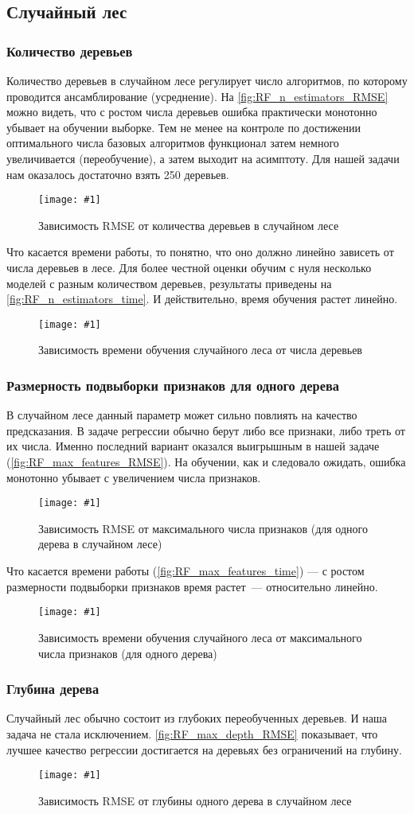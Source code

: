 \documentclass[12pt]{article}
\newcommand{\mpl}[2]{
    \begin{figure}[!h]
        \texttt{[image: \#1]}
        \centering
        \caption{#2}
        \label{fig:#1}
     \end{figure}
}
\begin{document}
\subsection{Случайный лес}
\subsubsection{Количество деревьев}
Количество деревьев в случайном лесе регулирует число алгоритмов, по которому проводится ансамблирование (усреднение). На \autoref{fig:RF_n_estimators_RMSE} можно видеть, что с ростом числа деревьев ошибка практически монотонно убывает на обучении выборке. Тем не менее на контроле по достижении оптимального числа базовых алгоритмов функционал затем немного увеличивается (переобучение), а затем выходит на асимптоту. Для нашей задачи нам оказалось достаточно взять 250 деревьев.

\mpl{RF_n_estimators_RMSE}{Зависимость RMSE от количества деревьев в случайном лесе}

Что касается времени работы, то понятно, что оно должно линейно зависеть от числа деревьев в лесе. Для более честной оценки обучим с нуля несколько моделей с разным количеством деревьев, результаты приведены на \autoref{fig:RF_n_estimators_time}. И действительно, время обучения растет линейно.
\mpl{RF_n_estimators_time}{Зависимость времени обучения случайного леса от числа деревьев}

\subsubsection{Размерность подвыборки признаков для одного дерева}
В случайном лесе данный параметр может сильно повлиять на качество предсказания. В задаче регрессии обычно берут либо все признаки, либо треть от их числа. Именно последний вариант оказался выигрышным в нашей задаче (\autoref{fig:RF_max_features_RMSE}). На обучении, как и следовало ожидать, ошибка монотонно убывает с увеличением числа признаков.
\mpl{RF_max_features_RMSE}{Зависимость RMSE от максимального числа признаков (для одного дерева в случайном лесе)}

Что касается времени работы (\autoref{fig:RF_max_features_time}) — с ростом размерности подвыборки признаков время растет~--- относительно линейно.
\mpl{RF_max_features_time}{Зависимость времени обучения случайного леса от максимального числа признаков (для одного дерева)}

\subsubsection{Глубина дерева}
Случайный лес обычно состоит из глубоких переобученных деревьев. И наша задача не стала исключением. \autoref{fig:RF_max_depth_RMSE} показывает, что лучшее качество регрессии достигается на деревьях без ограничений на глубину.  
\mpl{RF_max_depth_RMSE}{Зависимость RMSE от глубины одного дерева в случайном лесе}
\end{document}
